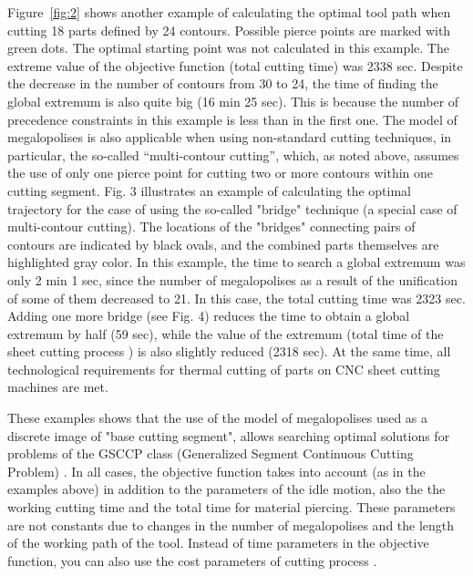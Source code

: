 \documentclass[numbers,sort&compress]{IntechOpen-Book}%
\begin{document}
Figure~\ref{fig:2} shows another example of calculating the optimal tool path when cutting 18 parts defined by 24 contours. Possible pierce points are marked with green dots. The optimal starting point was not calculated in this example. 
The extreme value of the objective function (total cutting time) was 2338 sec. Despite the decrease in the number of contours from 30 to 24, the time of finding the global extremum is also quite big (16 min 25 sec). This is because the number of precedence constraints in this example is less than in the first one. 
The model of megalopolises is also applicable  when using non-standard cutting techniques,
in particular, the so-called ``multi-contour cutting'', which, as noted above, assumes the use of only
one pierce point for cutting two or more contours within one cutting segment.
Fig. 3 illustrates an example of calculating the optimal trajectory for the case of using the so-called "bridge" technique 
(a special case of multi-contour cutting). The locations of the "bridges" connecting pairs of contours are indicated by black ovals, and the combined parts themselves are highlighted gray color. In this example, the time to search a global extremum was only 2 min 1 sec, since the number of megalopolises as a result of the unification of some of them decreased to 21. In this case, the total cutting time was 2323 sec. Adding one more bridge (see Fig. 4) reduces the time to obtain a global extremum by half (59 sec), while the value of the extremum (total time of the sheet cutting process ) is also slightly reduced (2318 sec). At the same time, all technological requirements for thermal cutting of parts on CNC sheet cutting machines are met.

These examples shows that the use of the model of megalopolises used as a discrete image of "base cutting segment", 
allows searching optimal solutions for problems of the GSCCP class (Generalized Segment Continuous Cutting Problem) \cite{bibx:112}. In all cases, the objective function takes into account (as in the examples above) in addition to the parameters of the idle motion, also the the working cutting time and the total time for material piercing. These parameters are not constants due to changes in the number of megalopolises and the length of the working path of the tool. Instead of time parameters in the objective function, you can also use the cost parameters of cutting process \cite{Tavaeva}.
\end{document}
